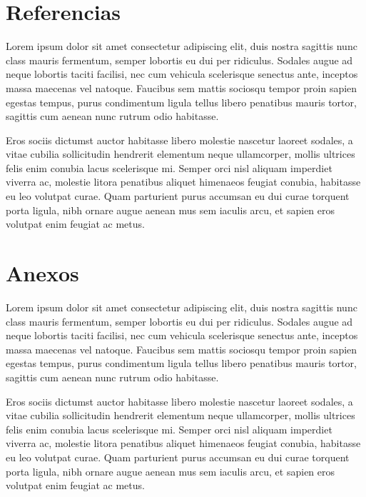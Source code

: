 \documentclass{article}
\begin{document}
\section{Referencias}
Lorem ipsum dolor sit amet consectetur adipiscing elit, duis nostra sagittis nunc class mauris fermentum, semper lobortis eu dui per ridiculus. Sodales augue ad neque lobortis taciti facilisi, nec cum vehicula scelerisque senectus ante, inceptos massa maecenas vel natoque. Faucibus sem mattis sociosqu tempor proin sapien egestas tempus, purus condimentum ligula tellus libero penatibus mauris tortor, sagittis cum aenean nunc rutrum odio habitasse.

Eros sociis dictumst auctor habitasse libero molestie nascetur laoreet sodales, a vitae cubilia sollicitudin hendrerit elementum neque ullamcorper, mollis ultrices felis enim conubia lacus scelerisque mi. Semper orci nisl aliquam imperdiet viverra ac, molestie litora penatibus aliquet himenaeos feugiat conubia, habitasse eu leo volutpat curae. Quam parturient purus accumsan eu dui curae torquent porta ligula, nibh ornare augue aenean mus sem iaculis arcu, et sapien eros volutpat enim feugiat ac metus.
\newpage

\section{Anexos}
Lorem ipsum dolor sit amet consectetur adipiscing elit, duis nostra sagittis nunc class mauris fermentum, semper lobortis eu dui per ridiculus. Sodales augue ad neque lobortis taciti facilisi, nec cum vehicula scelerisque senectus ante, inceptos massa maecenas vel natoque. Faucibus sem mattis sociosqu tempor proin sapien egestas tempus, purus condimentum ligula tellus libero penatibus mauris tortor, sagittis cum aenean nunc rutrum odio habitasse.

Eros sociis dictumst auctor habitasse libero molestie nascetur laoreet sodales, a vitae cubilia sollicitudin hendrerit elementum neque ullamcorper, mollis ultrices felis enim conubia lacus scelerisque mi. Semper orci nisl aliquam imperdiet viverra ac, molestie litora penatibus aliquet himenaeos feugiat conubia, habitasse eu leo volutpat curae. Quam parturient purus accumsan eu dui curae torquent porta ligula, nibh ornare augue aenean mus sem iaculis arcu, et sapien eros volutpat enim feugiat ac metus.
\end{document}
